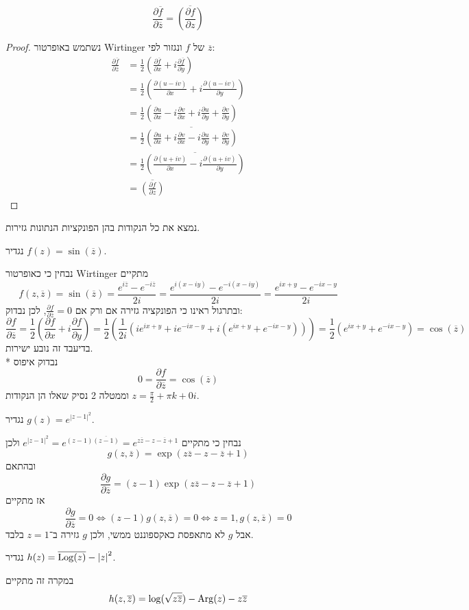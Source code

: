 \Subquestion{}
\[
	\frac{\partial \overline{f}}{\partial \overline{z}}
	= \overline{\left( \frac{\partial f}{\partial z} \right)}
\]
\begin{proof}
	נשתמש באופרטור Wirtinger של $f$ ונגזור לפי $\overline{z}$:
	\begin{align*}
		\frac{\partial \overline{f}}{\partial \overline{z}}
		& = \frac{1}{2} (\frac{\partial \overline{f}}{\partial x} + i\frac{\partial \overline{f}}{\partial y}) \\
		& = \frac{1}{2} (\frac{\partial (u - i v)}{\partial x} + i\frac{\partial (u - i v)}{\partial y}) \\
		& = \frac{1}{2} (\frac{\partial u}{\partial x} - i \frac{\partial v}{\partial x} + i \frac{\partial u}{\partial y} + \frac{\partial v}{\partial y}) \\
		& = \frac{1}{2} \overline{(\frac{\partial u}{\partial x} + i \frac{\partial v}{\partial x} - i \frac{\partial u}{\partial y} + \frac{\partial v}{\partial y})} \\
		& = \frac{1}{2} \overline{(\frac{\partial (u + iv)}{\partial x} - i \frac{\partial (u + iv)}{\partial y})} \\
		& = \overline{\left(\frac{\partial f}{\partial z}\right)}
	\end{align*}
\end{proof}

\Question{}
נמצא את כל הנקודות בהן הפונקציות הנתונות גזירות.

\Subquestion{}
נגדיר $f(z) = \sin(\overline{z})$.
\begin{solution}
	נבחין כי כאופרטור Wirtinger מתקיים
	\[
		f(z, \overline{z})
		= \sin(\overline{z})
		= \frac{e^{i \overline{z}} - e^{-i \overline{z}}}{2i}
		= \frac{e^{i (x - iy)} - e^{-i (x - iy)}}{2i}
		= \frac{e^{ix + y} - e^{-ix - y}}{2i}
	\]
	ובתרגול ראינו כי הפונקציה גזירה אם ורק אם $\frac{\partial f}{\partial \overline{z}} = 0$, לכן נבדוק:
	\[
		\frac{\partial f}{\partial \overline{z}}
		= \frac{1}{2} (\frac{\partial f}{\partial x} + i \frac{\partial f}{\partial y})
		= \frac{1}{2} (\frac{1}{2i}(i e^{ix + y} + i e^{-ix - y} + i(e^{ix + y} + e^{-ix - y})))
		= \frac{1}{2}(e^{ix + y} + e^{-ix - y})
		= \cos(\overline{z})
	\]
	בדיעבד זה נובע ישירות. \\*
	נבדוק איפוס
	\[
		0 = \frac{\partial f}{\partial \overline{z}} = \cos(\overline{z})
	\]
	וממטלה 2 נסיק שאלו הן הנקודות $z = \frac{\pi}{2} + \pi k + 0 i$.
\end{solution}

\Subquestion{}
נגדיר $g(z) = e^{{|z - 1|}^2}$.
\begin{solution}
	נבחין כי מתקיים $e^{{|z - 1|}^2} = e^{(z - 1) \overline{(z - 1)}} = e^{z \overline{z} - z - \overline{z} + 1}$ ולכן
	\[
		g(z, \overline{z}) = \exp(z \overline{z} - z - \overline{z} + 1)
	\]
	ובהתאם
	\[
		\frac{\partial g}{\partial \overline{z}} = (z - 1) \exp(z \overline{z} - z - \overline{z} + 1)
	\]
	אז מתקיים
	\[
		\frac{\partial g}{\partial \overline{z}} = 0
		\iff (z - 1) g(z, \overline{z}) = 0
		\iff z = 1, g(z, \overline{z}) = 0
	\]
	אבל $g$ לא מתאפסת כאקספוננט ממשי, ולכן $g$ גזירה ב־$z = 1$ בלבד.
\end{solution}

\Subquestion{}
נגדיר $h(z) = \overline{\operatorname{Log}(z)} - {|z|}^2$.
\begin{solution}
	במקרה זה מתקיים
	\[
		h(z, \overline{z}) = \log(\sqrt{z \overline{z}}) - \operatorname{Arg}(z) - z \overline{z}
	\]
\end{solution}


